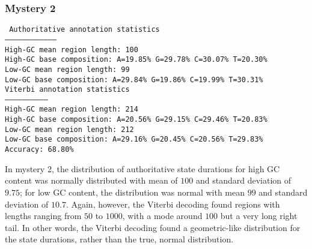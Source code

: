 \documentclass[a4paper]{article}
\begin{document}
\subsubsection*{Mystery 2}
{\tt
Authoritative annotation statistics\\
-----------------------------------\\
High-GC mean region length:  100\\
High-GC base composition: A=19.85\% G=29.78\% C=30.07\% T=20.30\%\\
Low-GC mean region length:  99\\
Low-GC base composition: A=29.84\% G=19.86\% C=19.99\% T=30.31\%\\

\noindent Viterbi annotation statistics\\
-----------------------------\\
High-GC mean region length:  214\\
High-GC base composition: A=20.56\% G=29.15\% C=29.46\% T=20.83\%\\
Low-GC mean region length:  212\\
Low-GC base composition: A=29.16\% G=20.45\% C=20.56\% T=29.83\%\\

\noindent Accuracy: 68.80\%\\
}

In mystery 2, the distribution of authoritative state
durations for high GC content was normally distributed with 
mean of $100$ and standard deviation of $9.75$; for low GC content,
the distribution was normal with mean $99$ and standard deviation
of $10.7$. Again, however, the Viterbi decoding found regions
with lengths ranging from $50$ to $1000$, with a mode around $100$
but a very long right tail. In other words, the Viterbi decoding
found a geometric-like distribution for the state durations, rather
than the true, normal distribution.
\end{document}
